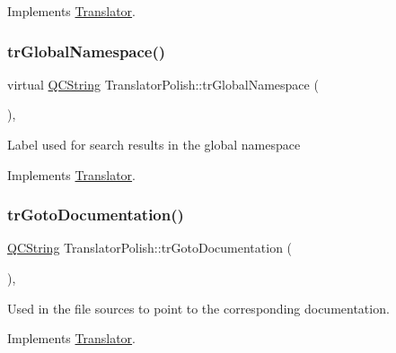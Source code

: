 Implements \mbox{\hyperlink{class_translator}{Translator}}.

\mbox{\label{class_translator_polish_aa90a61c4617148df8f16554588b6ae63}} 
\subsubsection{\texorpdfstring{trGlobalNamespace()}{trGlobalNamespace()}}
{\footnotesize\ttfamily virtual \mbox{\hyperlink{class_q_c_string}{Q\+C\+String}} Translator\+Polish\+::tr\+Global\+Namespace (\begin{DoxyParamCaption}{ }\end{DoxyParamCaption})\hspace{0.3cm}{\ttfamily [inline]}, {\ttfamily [virtual]}}

Label used for search results in the global namespace 

Implements \mbox{\hyperlink{class_translator}{Translator}}.

\mbox{\label{class_translator_polish_a92dc392aa7ba9219148d55e9ad1ca457}} 
\subsubsection{\texorpdfstring{trGotoDocumentation()}{trGotoDocumentation()}}
{\footnotesize\ttfamily \mbox{\hyperlink{class_q_c_string}{Q\+C\+String}} Translator\+Polish\+::tr\+Goto\+Documentation (\begin{DoxyParamCaption}{ }\end{DoxyParamCaption})\hspace{0.3cm}{\ttfamily [inline]}, {\ttfamily [virtual]}}

Used in the file sources to point to the corresponding documentation. 

Implements \mbox{\hyperlink{class_translator}{Translator}}.

\mbox{\label{class_translator_polish_a1959fa6fb4c06d512d00eb4bf956c27f}} 
